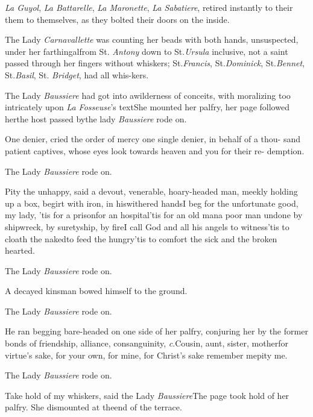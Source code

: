 \documentclass{article}
\begin{document}
\textit{La Guyol}, \textit{La Battarelle}, \textit{La
Maronette}, \textit{La Sabatiere}, retired instantly to
their\break
{} them to
themselves, as they bolted their doors on the inside.

The Lady \textit{Carnavallette} was counting her beads with both
hands, unsuspected, under her farthingal\tsh from St.\@
\textit{Antony} down to St.\@ \textit{Ursula} inclusive, not a saint
passed through her fingers without whis\-kers; St.\@ \textit{Francis},
St.\@ \textit{Dominick}, St.\@ \textit{Bennet}, St.\@ \textit{Basil}, St.\@
\textit{Bridget}, had all whis-\break kers.

The Lady \textit{Baussiere} had got into a\break wilderness of conceits,
with moralizing too intricately upon \textit{La Fosseuse}’s
text\tsh She mounted her palfry, her page followed
her\tsk the host passed by\tsk the lady \textit{Baussiere}
rode on.

One denier, cried the order of mercy\break
\tsk one single denier, in behalf of a thou-
sand patient captives, whose eyes look towards
heaven and you for their re-\break
demption.

\tsh The Lady \textit{Baussiere} rode on.

Pity the unhappy, said a devout, venerable, hoary-headed
man, meekly holding up a box, begirt with iron, in
his\break withered hands\tsh I beg for the unfortunate\tsk
good, my lady, ’tis for a prison\break \tsk for an
hospital\tsk ’tis for an old man\tsk\break a poor man
undone by shipwreck, by suretyship, by fire\tsk I call God
and all his angels to witness\tsk ’tis to cloath the
naked\tsk to feed the hungry\tsk ’tis to comfort the sick
and the broken hearted.

\tsh The Lady \textit{Baussiere} rode on.

A decayed kinsman bowed himself to the ground.

\tsh The Lady \textit{Baussiere} rode on.

He ran begging bare-headed on one side of her palfry, conjuring
her by the former bonds of friendship, alliance, consanguinity,
\et\textit{c}.\tsk Cousin, aunt, sister, mo\-ther\tsk for
virtue’s sake, for your own, for mine, for Christ’s
sake remember me\tsk\break pity me.

\tsh  The Lady \textit{Baussiere} rode on.

Take hold of my whiskers, said the Lady
\textit{Baussiere}\tsh The page took hold of her palfry. She
dismounted at the\break end of the terrace.
\end{document}

